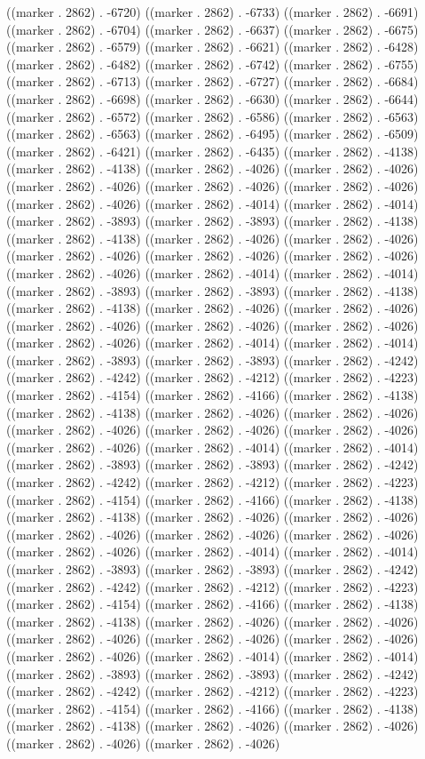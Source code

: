 ((marker . 2862) . -6720) ((marker . 2862) . -6733) ((marker . 2862) . -6691) ((marker . 2862) . -6704) ((marker . 2862) . -6637) ((marker . 2862) . -6675) ((marker . 2862) . -6579) ((marker . 2862) . -6621) ((marker . 2862) . -6428) ((marker . 2862) . -6482) ((marker . 2862) . -6742) ((marker . 2862) . -6755) ((marker . 2862) . -6713) ((marker . 2862) . -6727) ((marker . 2862) . -6684) ((marker . 2862) . -6698) ((marker . 2862) . -6630) ((marker . 2862) . -6644) ((marker . 2862) . -6572) ((marker . 2862) . -6586) ((marker . 2862) . -6563) ((marker . 2862) . -6563) ((marker . 2862) . -6495) ((marker . 2862) . -6509) ((marker . 2862) . -6421) ((marker . 2862) . -6435) ((marker . 2862) . -4138) ((marker . 2862) . -4138) ((marker . 2862) . -4026) ((marker . 2862) . -4026) ((marker . 2862) . -4026) ((marker . 2862) . -4026) ((marker . 2862) . -4026) ((marker . 2862) . -4026) ((marker . 2862) . -4014) ((marker . 2862) . -4014) ((marker . 2862) . -3893) ((marker . 2862) . -3893) ((marker . 2862) . -4138) ((marker . 2862) . -4138) ((marker . 2862) . -4026) ((marker . 2862) . -4026) ((marker . 2862) . -4026) ((marker . 2862) . -4026) ((marker . 2862) . -4026) ((marker . 2862) . -4026) ((marker . 2862) . -4014) ((marker . 2862) . -4014) ((marker . 2862) . -3893) ((marker . 2862) . -3893) ((marker . 2862) . -4138) ((marker . 2862) . -4138) ((marker . 2862) . -4026) ((marker . 2862) . -4026) ((marker . 2862) . -4026) ((marker . 2862) . -4026) ((marker . 2862) . -4026) ((marker . 2862) . -4026) ((marker . 2862) . -4014) ((marker . 2862) . -4014) ((marker . 2862) . -3893) ((marker . 2862) . -3893) ((marker . 2862) . -4242) ((marker . 2862) . -4242) ((marker . 2862) . -4212) ((marker . 2862) . -4223) ((marker . 2862) . -4154) ((marker . 2862) . -4166) ((marker . 2862) . -4138) ((marker . 2862) . -4138) ((marker . 2862) . -4026) ((marker . 2862) . -4026) ((marker . 2862) . -4026) ((marker . 2862) . -4026) ((marker . 2862) . -4026) ((marker . 2862) . -4026) ((marker . 2862) . -4014) ((marker . 2862) . -4014) ((marker . 2862) . -3893) ((marker . 2862) . -3893) ((marker . 2862) . -4242) ((marker . 2862) . -4242) ((marker . 2862) . -4212) ((marker . 2862) . -4223) ((marker . 2862) . -4154) ((marker . 2862) . -4166) ((marker . 2862) . -4138) ((marker . 2862) . -4138) ((marker . 2862) . -4026) ((marker . 2862) . -4026) ((marker . 2862) . -4026) ((marker . 2862) . -4026) ((marker . 2862) . -4026) ((marker . 2862) . -4026) ((marker . 2862) . -4014) ((marker . 2862) . -4014) ((marker . 2862) . -3893) ((marker . 2862) . -3893) ((marker . 2862) . -4242) ((marker . 2862) . -4242) ((marker . 2862) . -4212) ((marker . 2862) . -4223) ((marker . 2862) . -4154) ((marker . 2862) . -4166) ((marker . 2862) . -4138) ((marker . 2862) . -4138) ((marker . 2862) . -4026) ((marker . 2862) . -4026) ((marker . 2862) . -4026) ((marker . 2862) . -4026) ((marker . 2862) . -4026) ((marker . 2862) . -4026) ((marker . 2862) . -4014) ((marker . 2862) . -4014) ((marker . 2862) . -3893) ((marker . 2862) . -3893) ((marker . 2862) . -4242) ((marker . 2862) . -4242) ((marker . 2862) . -4212) ((marker . 2862) . -4223) ((marker . 2862) . -4154) ((marker . 2862) . -4166) ((marker . 2862) . -4138) ((marker . 2862) . -4138) ((marker . 2862) . -4026) ((marker . 2862) . -4026) ((marker . 2862) . -4026) ((marker . 2862) . -4026) 